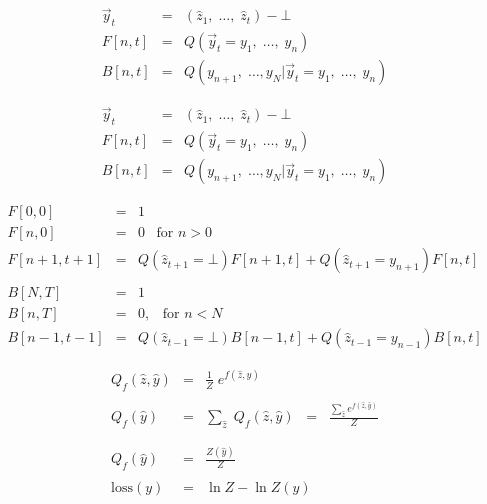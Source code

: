 {\begin{eqnarray*}
  \vec{y}_t & = & (\hat{z}_1,\;\ldots,\;\hat{z}_t)-\bot \\
  F[n,t] & = & Q(\vec{y}_t = y_1,\;\ldots,\;y_n) \\
  B[n,t] & = & Q(y_{n+1},\;\ldots,y_N | \vec{y}_t = y_1,\;\ldots,\;y_n)
\end{eqnarray*}


\begin{eqnarray*}
  \vec{y}_t & = & (\hat{z}_1,\;\ldots,\;\hat{z}_t)-\bot \\
  F[n,t] & = & Q(\vec{y}_t = y_1,\;\ldots,\;y_n) \\
  B[n,t] & = & Q(y_{n+1},\;\ldots,y_N | \vec{y}_t = y_1,\;\ldots,\;y_n)
\end{eqnarray*}

\begin{eqnarray*}
  F[0,0] & = & 1 \\
  F[n,0] & = & 0 \;\;\;\mbox{for $n > 0$} \\
  F[n+1,t+1] & = & Q(\hat{z}_{t+1} = \bot) F[n+1,t] + Q(\hat{z}_{t+1} = y_{n+1})F[n,t] \\
  \\
  B[N,T] & = & 1 \\
  B[n,T] & = & 0,\;\;\;\mbox{for $n < N$} \\
  B[n-1,t-1] & = & Q(\hat{z}_{t-1} = \bot)B[n-1,t] +  Q(\hat{z}_{t-1} = y_{n-1})B[n,t]
\end{eqnarray*}


\begin{eqnarray*}
  Q_f(\hat{z},\hat{y}) & = & \frac{1}{Z} \; e^{f(\hat{z},\hat{y})}  \\
  \\
  Q_f(\hat{y}) & = & \sum_{\hat{z}}\;Q_f(\hat{z},\hat{y}) \;\; =\;\; \frac{\sum_{\hat{z}} e^{f(\hat{z},\hat{y})}}{Z} \\
  \\
  \\
  Q_f(\hat{y})& = & \frac{Z(\hat{y})}{Z} \\
  \\
  \mathrm{loss}(y) & = & \ln Z - \ln Z(y)
\end{eqnarray*}


}
